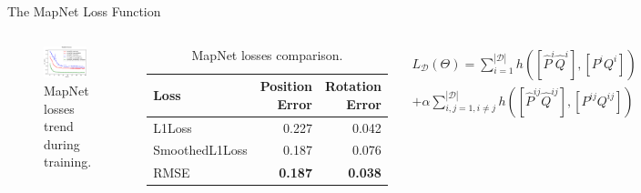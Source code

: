 \documentclass[
    center,
]{beamer}
\begin{document}
\begin{frame}{The MapNet Loss Function}
    \begin{columns}
        \begin{figure}
            \centering
            \includegraphics[width=0.9\textwidth]{../imgs/mapnet_losses.png}
            \caption{MapNet losses trend during training.}
        \end{figure}

        \begin{table}[htbp]
            \begin{center}
                \footnotesize
                \begin{tabular}{lrr}
                    \toprule
                    Loss           & \thead{Position                  \\Error} & \thead{Rotation\\Error} \\
                    \midrule
                    L1Loss         & 0.227           & 0.042          \\
                    SmoothedL1Loss & 0.187           & 0.076          \\
                    RMSE           & \textbf{0.187}  & \textbf{0.038} \\
                    \bottomrule
                \end{tabular}
                \caption{MapNet losses comparison.}
                \label{tab:mapnet-losses}
            \end{center}
        \end{table}
        \begin{multline*}
            L_\mathcal{D}(\Theta) = \sum\limits_{i=1}^{|\mathcal{D}|} h([\hat{P}^i \hat{Q}^i], [P^i Q^i]) \\
            + \alpha\sum\limits_{i,j=1, i\neq j}^{|\mathcal{D}|} h([\hat{P}^{ij} \hat{Q}^{ij}], [P^{ij} Q^{ij}])
        \end{multline*}
    \end{columns}
\end{frame}
\end{document}

